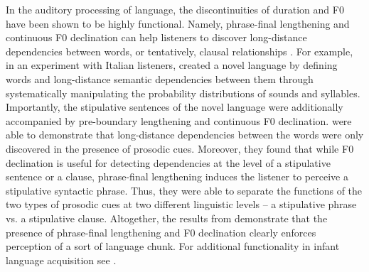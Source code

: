 \documentclass[output=paper]{langscibook}
\begin{document}
	In the auditory processing of language, the discontinuities of duration and F0 have been shown to be highly functional. Namely, phrase-final lengthening and continuous F0 declination can help listeners to discover long-distance dependencies between words, or tentatively, clausal relationships \citep[][]{cruzPaviaEtAl2019, langusEtAl2012, ordinEtAl2017}. For example, in an experiment with Italian listeners, \citet[][]{langusEtAl2012} created a novel language by defining words and long-distance semantic dependencies between them through systematically manipulating the probability distributions of sounds and syllables. Importantly, the stipulative sentences of the novel language were additionally accompanied by pre-boundary lengthening and continuous F0 declination. \citet[][]{langusEtAl2012} were able to demonstrate that long-distance dependencies between the words were only discovered in the presence of prosodic cues. Moreover, they found that while F0 declination is useful for detecting dependencies at the level of a stipulative sentence or a clause, phrase-final lengthening induces the listener to perceive a stipulative syntactic phrase. Thus, they were able to separate the functions of the two types of prosodic cues at two different linguistic levels -- a stipulative phrase vs. a stipulative clause. Altogether, the results from \citet[][]{langusEtAl2012} demonstrate that the presence of phrase-final lengthening and F0 declination clearly enforces perception of a sort of language chunk. For additional functionality in infant language acquisition see .
	
\end{document}
